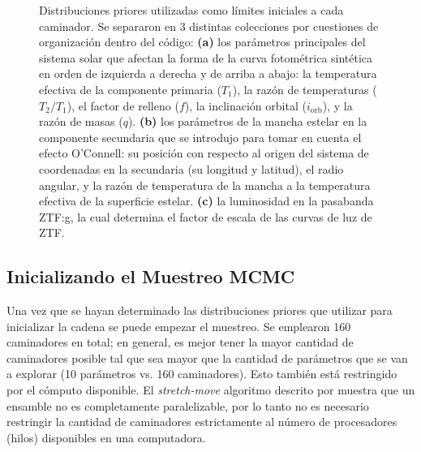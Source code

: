 \begin{figure}[!ht]
	\centering
	\caption{Distribuciones priores utilizadas como límites iniciales a cada
	caminador. Se separaron en 3 distintas colecciones por cuestiones de
	organización dentro del código: \textbf{(a)} los parámetros principales del
	sistema solar que afectan la forma de la curva fotométrica sintética en
	orden de izquierda a derecha y de arriba a abajo: la temperatura efectiva de
	la componente primaria ($T_{1}$), la razón de temperaturas ($T_2/T_1$), el
	factor de relleno ($f$), la inclinación orbital ($i_{\mathrm{orb}}$), y la
	razón de masas ($q$). \textbf{(b)} los parámetros de la mancha estelar en la
	componente secundaria que se introdujo para tomar en cuenta el efecto
	O'Connell: su posición con respecto al origen del sistema de coordenadas en
	la secundaria (su longitud y latitud), el radio angular, y la
	razón de temperatura de la mancha a la temperatura efectiva
	de la superficie estelar. \textbf{(c)} la
	luminosidad en la pasabanda ZTF:g, la cual determina el factor de escala de
	las curvas de luz de ZTF.}
	\label{figuraColeccionesPrioresZtf}
\end{figure}

\newpage
\clearpage

\subsection{Inicializando el Muestreo MCMC}

Una vez que se hayan determinado las distribuciones priores que utilizar para
inicializar la cadena se puede empezar el muestreo. Se emplearon 160 caminadores
en total; en general, es mejor tener la mayor cantidad de caminadores posible
tal que sea mayor que la cantidad de parámetros que se van a explorar (10
parámetros vs. 160 caminadores). Esto también está restringido por el cómputo
disponible. El \textit{stretch-move} algoritmo descrito por
 muestra que un ensamble no es
completamente paralelizable, por lo tanto no es necesario restringir la cantidad
de caminadores estrictamente al número de procesadores (hilos) disponibles en
una computadora. 


